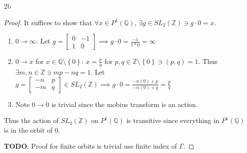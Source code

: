 \documentclass{article}
\newcommand{\Q}{\mathbb{Q}}
\newcommand{\Z}{\mathbb{Z}}
\begin{document}
\begin{PROB}{2b}\label{Problem 2b.}
\end{PROB}
\begin{proof}
    It suffices to show that $\forall x \in P^1(\Q)$, $\exists g \in SL_2(\Z) \ni g \cdot 0 = x$.  
    
    \begin{enumerate}
        \item $0 \to \infty$: Let $g = \begin{bmatrix}
            0 & -1 \\
            1 & 0
        \end{bmatrix} \implies g \cdot 0 = \frac{-1}{1*0} = \infty$
        \item $0 \to x$ for $x \in \Q \setminus \left\{ 0 \right\}$: $x = \frac{p}{q}$ for $p, q\in \Z \setminus \left\{ 0 \right\} \ni (p, q) = 1$. Thus $\exists m, n \in \Z \ni mp - nq = 1$. Let $g = \begin{bmatrix}
            -n & p \\ -m & q
        \end{bmatrix} \in SL_2(\Z) \implies g \cdot 0 = \frac{-n(0) + p}{-n(0) + q} = \frac{p}{q}$ 
        \item Note $0 \to 0$ is trivial since the mobius transform is an action.       
    \end{enumerate} 
    
    Thus the action of $SL_2(\Z)$ on $P^1(\Q)$ is transitive since everything in $P^1(\Q)$ is in the orbit of $0$. 
    
    
    \textbf{TODO}: Proof for finite orbits is trivial use finite index of $\Gamma$.  
\end{proof}
\end{document}
